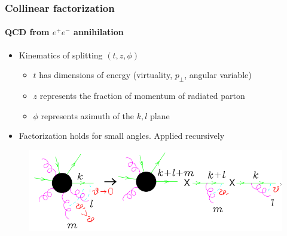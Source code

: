 \documentclass[aspectratio=43]{beamer}
\begin{document}
\begin{frame}

	\frametitle{Collinear factorization}
	\framesubtitle{QCD from $e^{+}e^{-}$ annihilation}
	
	\begin{itemize} 
		\item Kinematics of splitting $(t, z, \phi)$
		\begin{itemize}
			\item $t$ has dimensions of energy (virtuality, $p_{\perp}$, angular variable)
			\item $z$ represents the fraction of momentum of radiated parton
			\item $\phi$ represents azimuth of the $k, l$ plane
		\end{itemize}
	
	\vspace{0.5cm}
	
		\item Factorization holds for small angles. Applied recursively
	\end{itemize}
	
	\begin{figure}
		\includegraphics[width = 7 cm]{plots/shower_4.png}
	\end{figure}

\end{frame}

\begin{frame}


\end{frame}
\end{document}

